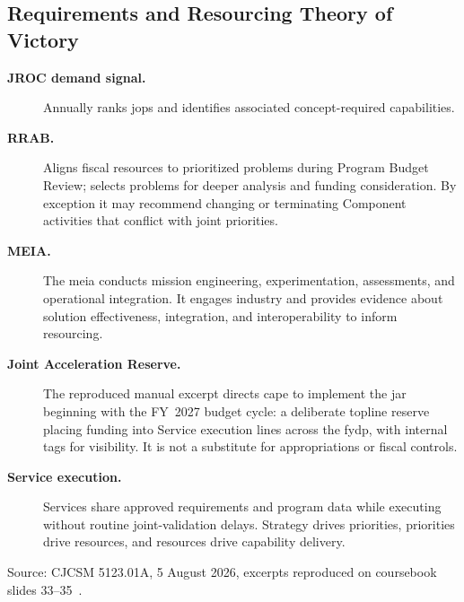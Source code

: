\documentclass[../main.tex]{subfiles}
\begin{document}
\subsection{Requirements and Resourcing Theory of Victory}
\begin{description}
  \item[\textbf{JROC demand signal.}] Annually ranks \acp{jop} and identifies associated concept-required capabilities.
  \item[\textbf{RRAB.}] Aligns fiscal resources to prioritized problems during Program Budget Review; selects problems for deeper analysis and funding consideration. By exception it may recommend changing or terminating Component activities that conflict with joint priorities.
  \item[\textbf{MEIA.}] The \ac{meia} conducts mission engineering, experimentation, assessments, and operational integration. It engages industry and provides evidence about solution effectiveness, integration, and interoperability to inform resourcing.
  \item[\textbf{Joint Acceleration Reserve.}] The reproduced manual excerpt directs \ac{cape} to implement the \ac{jar} beginning with the FY~2027 budget cycle: a deliberate topline reserve placing funding into Service execution lines across the \ac{fydp}, with internal tags for visibility. It is not a substitute for appropriations or fiscal controls.
  \item[\textbf{Service execution.}] Services share approved requirements and program data while executing without routine joint-validation delays. Strategy drives priorities, priorities drive resources, and resources drive capability delivery.
\end{description}
\noindent Source: CJCSM 5123.01A, 5 August 2026, excerpts reproduced on coursebook slides 33--35~\autocite{edo-3-3-3-jfrp-2026}.
\end{document}
